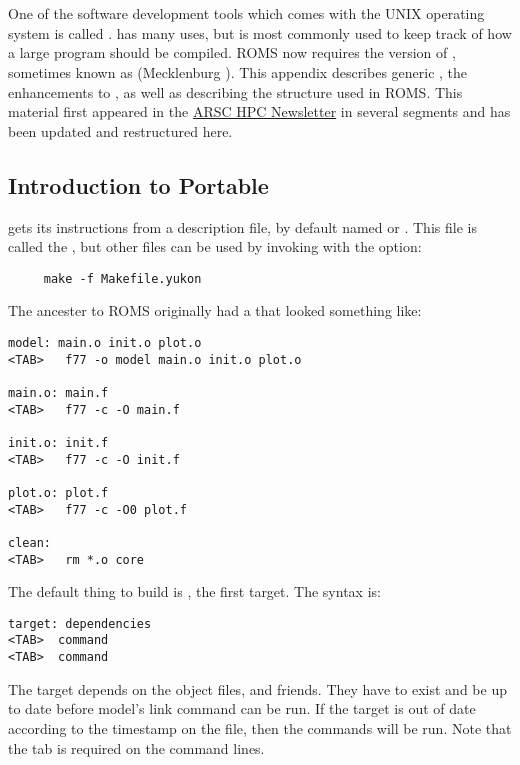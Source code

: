 \section{}
\label{Gmake}
One of the software development tools which comes with the UNIX
operating system is called .  has many uses,
but is most commonly used to keep track of how a large program
should be compiled. ROMS now requires the  version of 
, sometimes known as  (Mecklenburg \cite{GMAKE}).
This appendix describes generic , the 
enhancements to , as well as describing the
 structure used in ROMS. This material first
appeared in the \href{http://www.arsc.edu/support/news/HPCnews.shtml}{ARSC
HPC Newsletter} in several segments and has been updated and restructured
here.

\subsection{Introduction to Portable }

 gets its instructions from a description file, by default named
 or . This file is called the
, but other files
can be used by invoking  with the  option:
\begin{verbatim}
     make -f Makefile.yukon
\end{verbatim}

The ancester to ROMS originally had a  that looked
something like:
\begin{verbatim}
model: main.o init.o plot.o
<TAB>   f77 -o model main.o init.o plot.o

main.o: main.f
<TAB>   f77 -c -O main.f

init.o: init.f
<TAB>   f77 -c -O init.f

plot.o: plot.f
<TAB>   f77 -c -O0 plot.f

clean:
<TAB>   rm *.o core
\end{verbatim}
The default thing to build is , the first target. The syntax
is:
\begin{verbatim}
target: dependencies
<TAB>  command
<TAB>  command
\end{verbatim}
The target  depends on the object files, 
and friends. They have to exist and be up to date before model's link
command can be run. If the target is out of date according to the
timestamp on the file, then the commands will
be run. Note that the tab is required on the command lines.

